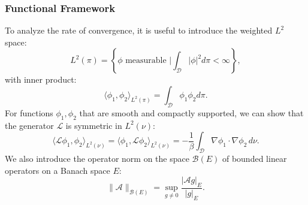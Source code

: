 \documentclass[11pt, twoside]{report}
\begin{document}
\subsubsection{Functional Framework}
To analyze the rate of convergence, it is useful to introduce the weighted $L^2$ space:
\begin{equation} \label{weightedL2}
    L^2(\pi) = \left\{\phi \text{ measurable } \bigg| \int_\mathcal{D} |\phi|^2 d\pi < \infty  \right\},
\end{equation}
with inner product:
\begin{equation*}
\langle \phi_1, \phi_2 \rangle_{L^2(\pi)} = \int_\mathcal{D} \phi_1 \phi_2 d\pi.
\end{equation*}
For functions $\phi_1, \phi_2$ that are smooth and compactly supported, we can show that the generator $\mathcal{L}$ is symmetric in $L^2(\nu)$:
\begin{equation}
\langle \mathcal{L} \phi_1, \phi_2 \rangle_{L^2(\nu)} = \langle \phi_1, \mathcal{L} \phi_2 \rangle_{L^2(\nu)} = -\frac{1}{\beta} \int_\mathcal{D} \nabla \phi_1 \cdot \nabla \phi_2 \, d\nu.
\end{equation}
We also introduce the operator norm on the space $\mathcal{B}(E)$ of bounded linear operators on a Banach space $E$:
\begin{equation}
\|\mathcal{A}\|_{\mathcal{B}(E)} = \sup_{g \neq 0} \frac{|\mathcal{A} g|_E}{|g|_E}.
\end{equation}

\end{document}
